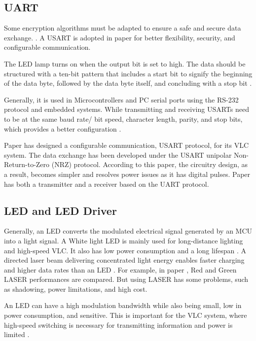 \subsection{UART}

Some encryption algorithms must be adapted to ensure a safe and secure data exchange. \cite{6757172}. A \ac{USART} is adopted in paper \cite{7420990} for better flexibility, security, and configurable communication.

The LED lamp turns on when the output bit is set to high. The data should be structured with a ten-bit pattern that includes a start bit to signify the beginning of the data byte, followed by the data byte itself, and concluding with a stop bit \cite{6757172}.

Generally, it is used in Microcontrollers and PC serial ports using the RS-232 protocol and embedded systems. While transmitting and receiving \ac{USART}s need to be at the same baud rate/ bit speed, character length, parity, and stop bits, which provides a better configuration \cite{7420990}\cite{wright_2022}.

Paper \cite{7420990} has designed a configurable communication, \ac{USART} protocol, for its \ac{VLC} system. The data exchange has been developed under the \ac{USART} unipolar Non-Return-to-Zero (NRZ) protocol. According to this paper, the circuitry design, as a result, becomes simpler and resolves power issues as it has digital pulses. 
Paper \cite{thongsa2018design} has both a transmitter and a receiver based on the \ac{UART} protocol.

\subsection{LED and LED Driver}
Generally, an LED converts the modulated electrical signal generated by an \ac{MCU} into a light signal. A White light LED is mainly used for long-distance lighting and high-speed \ac{VLC}\cite{mahmoud2022design}. It also has low power consumption and a long lifespan \cite{7420990}\cite{7292748}. A directed laser beam delivering concentrated light energy enables faster charging and higher data rates than an LED \cite{fan2017circuit}. For example, in paper \cite{fong2012integrated}, Red and Green LASER performances are compared. But using LASER has some problems, such as shadowing, power limitations, and high cost\cite{rehman2019visible}. 

An LED can have a high modulation bandwidth while also being small, low in power consumption, and sensitive. This is important for the \ac{VLC} system, where high-speed switching is necessary for transmitting information and power is limited \cite{mahmoud2022design}. 

